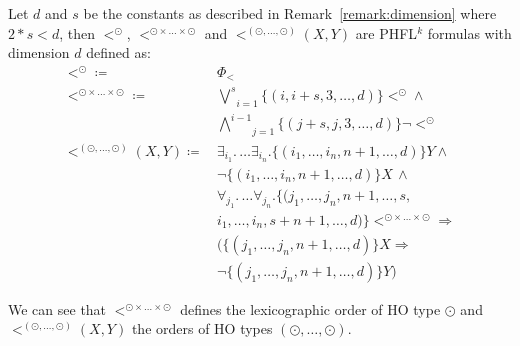 \begin{definition}
    \label{definition:lower_bound_less_second}
    Let $d$ and $s$ be the constants as described in Remark~\ref{remark:dimension} where $2*s < d$, then $<^\odot$, $<^{\odot \times \dots
    \times \odot}$ and $<^{(\odot, \dots, \odot)}(X, Y)$ are PHFL$^k$ formulas with dimension $d$ defined as:
    \begin{align*}
        <^\odot \coloneqq &\,\Phi_< \\
        <^{\odot \times \dots \times \odot} \coloneqq
            &\,\underset{i = 1}{\overset{s}{\bigvee}}\{(i, i + s, 3, \dots, d)\} <^\odot \wedge \\
            &\,\underset{j = 1}{\overset{i - 1}{\bigwedge}}\{(j + s, j, 3, \dots, d)\} \neg <^\odot \\
        <^{(\odot, \dots, \odot)}(X, Y) \coloneqq
            &\,\exists_{i_1}.\, \dots \exists_{i_n}. \{(i_1, \dots, i_n, n + 1,\dots, d)\}Y \wedge \\
            &\,\neg \{(i_1, \dots, i_n, n + 1, \dots, d)\} X\,\wedge \\
            &\, \forall_{j_1}. \,\dots \forall_{j_n}. \{(j_1, \dots, j_n, n+1, \dots, s, \\
            &\,i_1, \dots, i_n, s + n + 1, \dots,  d)\}<^{\odot \times \dots \times \odot} \Rightarrow \\
            &\,(\{(j_1,\dots, j_n, n + 1, \dots, d)\} X \Rightarrow \\
            &\,\neg \{(j_1, \dots, j_n, n + 1, \dots, d)\} Y)
    \end{align*}
\end{definition}
We can see that  $<^{\odot \times \dots \times \odot}$ defines the lexicographic order of HO type $\odot$ and $<^{(\odot, \dots, \odot)}(X, Y)$ the orders of HO types $(\odot, \dots, \odot)$.

